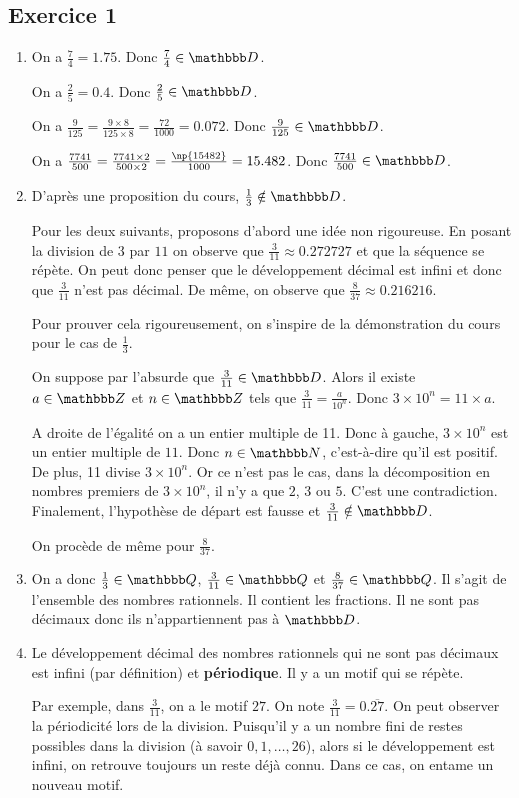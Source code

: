 \documentclass[a4paper,12pt, french, noSujetB]{article}
\begin{document}
\subsection*{Exercice 1}
\begin{enumerate}
    \item
    On a $\frac{7}{4} = 1.75$. Donc $\frac{7}{4}\in\D$.

    On a $\frac{2}{5} = 0.4$. Donc $\frac{2}{5}\in\D$.

    On a $\frac{9}{125} = \frac{9\times8}{125\times8} = \frac{72}{1000} = 0.072$. Donc $\frac{9}{125}\in\D$.

    On a $\frac{7741}{500} = \frac{7741\times2}{500\times2}=\frac{\np{15482}}{1000} = 15.482$. Donc $\frac{7741}{500} \in\D$.
    \item D'après une proposition du cours, $\frac{1}{3}\notin\D$.

    Pour les deux suivants, proposons d'abord une idée non rigoureuse. En posant la division de $3$ par $11$ on observe que $\frac{3}{11}\approx0.272727$ et que la séquence se répète. On peut donc penser que le développement décimal est infini et donc que $\frac{3}{11}$ n'est pas décimal. De même, on observe que $\frac{8}{37}\approx0.216216$.

    Pour prouver cela rigoureusement, on s'inspire de la démonstration du cours pour le cas de $\frac{1}{3}$.

    On suppose par l'absurde que $\frac{3}{11}\in\D$. Alors il existe $a\in\Z$ et $n\in\Z$ tels que $\frac{3}{11}=\frac{a}{10^n}$. Donc $3\times10^n=11\times a$.

    A droite de l'égalité on a un entier multiple de 11. Donc à gauche, $3\times10^n$ est un entier multiple de $11$. Donc $n\in\N$, c'est-à-dire qu'il est positif. De plus, 11 divise $3\times10^n$. Or ce n'est pas le cas, dans la décomposition en nombres premiers de $3\times10^n$, il n'y a que $2$, $3$ ou $5$. C'est une contradiction. Finalement, l'hypothèse de départ est fausse et $\frac{3}{11}\notin\D$.

    On procède de même pour $\frac{8}{37}$.

    \item On a donc $\frac{1}{3}\in\Q$, $\frac{3}{11}\in\Q$ et $\frac{8}{37}\in\Q$. Il s'agit de l'ensemble des nombres rationnels. Il contient les fractions. Il ne sont pas décimaux donc ils n'appartiennent pas à $\D$.
    \item Le développement décimal des nombres rationnels qui ne sont pas décimaux est infini (par définition) et \textbf{périodique}. Il y a un motif qui se répète.

    Par exemple, dans $\frac{3}{11}$, on a le motif $27$. On note $\frac{3}{11} = 0.\overline{27}$. On peut observer la périodicité lors de la division. Puisqu'il y a un nombre fini de restes possibles dans la division (à savoir $0, 1, \dots, 26$), alors si le développement est infini, on retrouve toujours un reste déjà connu. Dans ce cas, on entame un nouveau motif.
\end{enumerate}
\end{document}
